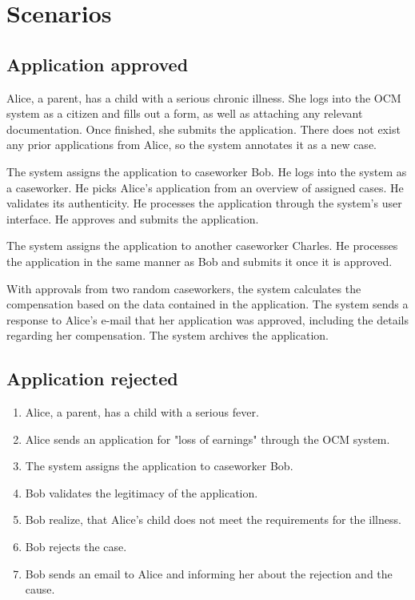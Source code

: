 \documentclass{article}
\begin{document}
\section{Scenarios}

\subsection*{Application approved}

Alice, a parent, has a child with a serious chronic illness. She logs into the OCM system as a citizen and fills out a form, as well as attaching any relevant documentation. Once finished, she submits the application. There does not exist any prior applications from Alice, so the system annotates it as a new case.

\vspace{2mm}

The system assigns the application to caseworker Bob. He logs into the system as a caseworker. He picks Alice's application from an overview of assigned cases. He validates its authenticity. He processes the application through the system's user interface. He approves and submits the application.

\vspace{2mm}

The system assigns the application to another caseworker Charles. He processes the application in the same manner as Bob and submits it once it is approved.

\vspace{2mm}

With approvals from two random caseworkers, the system calculates the compensation based on the data contained in the application. The system sends a response to Alice's e-mail that her application was approved, including the details regarding her compensation. The system archives the application.

\subsection*{Application rejected}
\begin{enumerate}
    \item Alice, a parent, has a child with a serious fever. 
    \item Alice sends an application for "loss of earnings" through the OCM system.
    \item The system assigns the application to caseworker Bob.
    \item Bob validates the legitimacy of the application.
    \item Bob realize, that Alice's child does not meet the requirements for the illness.
    \item Bob rejects the case.
    \item Bob sends an email to Alice and informing her about the rejection and the cause. 
\end{enumerate}
\end{document}
